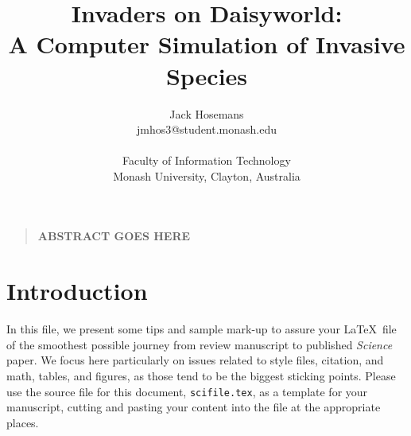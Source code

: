 \documentclass[12pt]{article}
\title{Invaders on Daisyworld:\\ A Computer Simulation of Invasive Species}
\author{
  Jack Hosemans\\
  \normalsize{jmhos3@student.monash.edu}\\
  \\
  \normalsize{Faculty of Information Technology}\\
  \normalsize{Monash University, Clayton, Australia}
}
\date{}
\newenvironment{sciabstract}{%
\begin{quote} \bf}
{\end{quote}}
\begin{document}
 


\baselineskip24pt


\maketitle 




\begin{sciabstract}
  ABSTRACT GOES HERE
\end{sciabstract}




\section*{Introduction}

In this file, we present some tips and sample mark-up to assure your
\LaTeX\ file of the smoothest possible journey from review manuscript
to published {\it Science\/} paper.  We focus here particularly on
issues related to style files, citation, and math, tables, and
figures, as those tend to be the biggest sticking points.  Please use
the source file for this document, \texttt{scifile.tex}, as a template
for your manuscript, cutting and pasting your content into the file at
the appropriate places.
\end{document}
